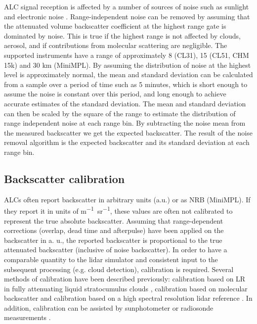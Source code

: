 ALC signal reception is affected by a number of sources of noise such
as sunlight and electronic noise \citep{kotthaus2016}. Range-independent
noise can be removed by assuming that the attenuated
volume backscatter coefficient at the highest range gate is dominated by
noise. This is true if the highest range is not affected
by clouds, aerosol, and if contributions from molecular scattering are negligible.
The supported instruments have a range of approximately 8 (CL31), 15
(CL51, CHM 15k) and 30 km (MiniMPL).
By assuming the distribution of noise at the highest level is approximately
normal, the mean and standard deviation can be calculated from a sample over a
period of time such as 5 minutes, which is short enough to assume the noise is constant
over this period, and long enough to achieve accurate estimates of the standard
deviation. The mean and standard deviation can then be scaled by the
square of the range to estimate the distribution of range independent noise at
each range bin. By subtracting the noise mean from the measured backscatter
we get the expected backscatter. The result of the noise removal algorithm
is the expected backscatter and its standard deviation at each range bin.

\subsection{Backscatter calibration}
\label{sec:3:backscatter-calibration}

ALCs often report backscatter in arbitrary units (a.u.) or as NRB (MiniMPL).
If they report it in units of \unit{m^{-1}sr^{-1}}, these values are often not calibrated to
represent the true absolute backscatter.
Assuming that range-dependent corrections (overlap, dead time and afterpulse)
have been applied on the backscatter in a. u., the reported backscatter is proportional
to the true attenuated backscatter (inclusive of noise backscatter).
In order to have a comparable quantity to the lidar simulator and consistent
input to the subsequent processing (e.g. cloud detection), calibration is
required.
Several methods of calibration have been described previously:
calibration based on LR in fully attenuating liquid stratocumulus
clouds \citep{oconnor2004,hopkin2019}, calibration based on molecular
backscatter \citep{wiegner2014} and calibration based on a high spectral resolution lidar
reference \citep{heese2010,jin2015}. In addition, calibration can be
assisted by sunphotometer or radiosonde measurements \citep{wiegner2014}.


